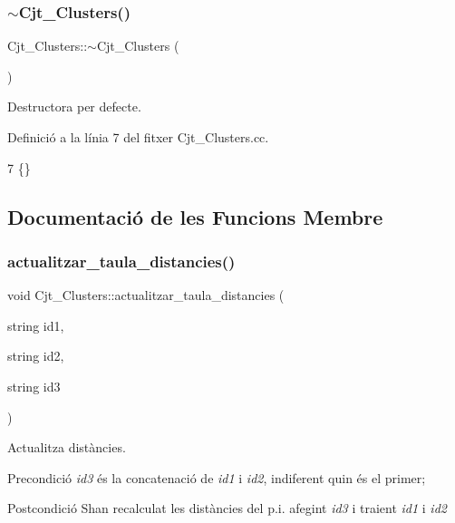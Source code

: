 \subsubsection{\texorpdfstring{$\sim$\+Cjt\+\_\+\+Clusters()}{~Cjt\_Clusters()}}
{\footnotesize\ttfamily Cjt\+\_\+\+Clusters\+::$\sim$\+Cjt\+\_\+\+Clusters (\begin{DoxyParamCaption}{ }\end{DoxyParamCaption})}



Destructora per defecte. 



Definició a la línia 7 del fitxer Cjt\+\_\+\+Clusters.\+cc.


\begin{DoxyCode}
7 \{\}
\end{DoxyCode}


\subsection{Documentació de les Funcions Membre}
\mbox{\label{class_cjt___clusters_a15ac7653c39fe7ed1f2e21debeb3b24b}} 
\subsubsection{\texorpdfstring{actualitzar\+\_\+taula\+\_\+distancies()}{actualitzar\_taula\_distancies()}}
{\footnotesize\ttfamily void Cjt\+\_\+\+Clusters\+::actualitzar\+\_\+taula\+\_\+distancies (\begin{DoxyParamCaption}\item[{string}]{id1,  }\item[{string}]{id2,  }\item[{string}]{id3 }\end{DoxyParamCaption})\hspace{0.3cm}{\ttfamily [private]}}



Actualitza distàncies. 

\begin{DoxyPrecond}{Precondició}
{\itshape id3} és la concatenació de {\itshape id1} i {\itshape id2}, indiferent quin és el primer; 
\end{DoxyPrecond}
\begin{DoxyPostcond}{Postcondició}
S\textquotesingle{}han recalculat les distàncies del p.\+i. afegint {\itshape id3} i traient {\itshape id1} i {\itshape id2} 
\end{DoxyPostcond}


